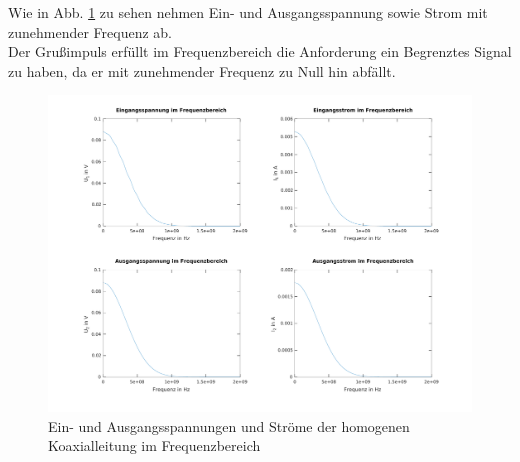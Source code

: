 \documentclass[Protokollheft.tex]{subfiles}
\begin{document}
\noindent
Wie in Abb. \ref{fig:einausspanstromfrequenz} zu sehen nehmen Ein- und Ausgangsspannung sowie Strom mit zunehmender Frequenz ab. \\
Der Grußimpuls erfüllt im Frequenzbereich die Anforderung ein Begrenztes Signal zu haben, da er mit zunehmender Frequenz zu Null hin abfällt. 
\begin{figure}
	\centering
	\includegraphics[width=0.9\linewidth]{EinAusSpanStromFrequenz}
	\caption{Ein- und Ausgangsspannungen  und Ströme der homogenen Koaxialleitung im Frequenzbereich}
	\label{fig:einausspanstromfrequenz}
\end{figure}
\end{document}
